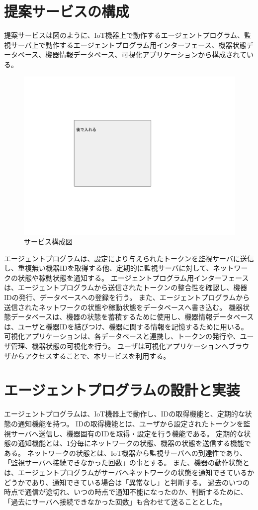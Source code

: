\section{提案サービスの構成}
提案サービスは図のように、IoT機器上で動作するエージェントプログラム、監視サーバ上で動作するエージェントプログラム用インターフェース、機器状態データベース、機器情報データベース、可視化アプリケーションから構成されている。
\begin{figure}[htbp]
\includegraphics[width=16cm]{images/test.png}
\caption{サービス構成図}
\label{fig:blockdiagram}
\end{figure}
エージェントプログラムは、設定により与えられたトークンを監視サーバに送信し、重複無い機器IDを取得する他、定期的に監視サーバに対して、ネットワークの状態や稼動状態を通知する。
エージェントプログラム用インターフェースは、エージェントプログラムから送信されたトークンの整合性を確認し、機器IDの発行、データベースへの登録を行う。
また、エージェントプログラムから送信されたネットワークの状態や稼動状態をデータベースへ書き込む。
機器状態データベースは、機器の状態を蓄積するために使用し、機器情報データベースは、ユーザと機器IDを結びつけ、機器に関する情報を記憶するために用いる。
可視化アプリケーションは、各データベースと連携し、トークンの発行や、ユーザ管理、機器状態の可視化を行う。
ユーザは可視化アプリケーションへブラウザからアクセスすることで、本サービスを利用する。

\section{エージェントプログラムの設計と実装}
エージェントプログラムは、IoT機器上で動作し、IDの取得機能と、定期的な状態の通知機能を持つ。
IDの取得機能とは、ユーザから設定されたトークンを監視サーバへ送信し、機器固有のIDを取得・設定を行う機能である。
定期的な状態の通知機能とは、1分毎にネットワークの状態、機器の状態を送信する機能である。
ネットワークの状態とは、IoT機器から監視サーバへの到達性であり、「監視サーバへ接続できなかった回数」の事とする。
また、機器の動作状態とは、エージェントプログラムがサーバへネットワークの状態を通知できているかどうかであり、通知できている場合は「異常なし」と判断する。
過去のいつの時点で通信が途切れ、いつの時点で通知不能になったのか、判断するために、「過去にサーバへ接続できなかった回数」も合わせて送ることとした。

